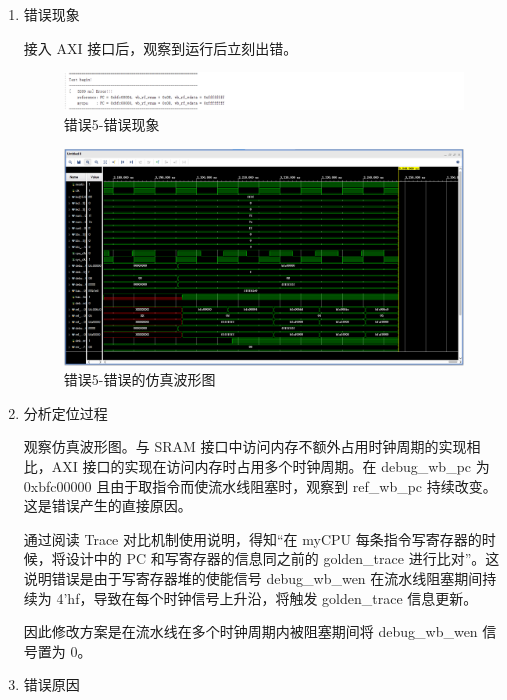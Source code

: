 \begin{enumerate}[(1)]
    \item 错误现象

接入 AXI 接口后，观察到运行后立刻出错。

\begin{figure}[H]
    \centering
    \includegraphics[width=\textwidth]{image/错误5-错误现象1.png}
    \caption{错误5-错误现象}
    \label{fig:错误5-错误现象1}
\end{figure}

\begin{figure}[H]
    \centering
    \includegraphics[width=\textwidth]{image/错误5-错误现象2.png}
    \caption{错误5-错误的仿真波形图}
    \label{fig:错误5-错误现象2}
\end{figure}

    \item 分析定位过程

观察仿真波形图。与 SRAM 接口中访问内存不额外占用时钟周期的实现相比，AXI 接口的实现在访问内存时占用多个时钟周期。在 debug\_wb\_pc 为 0xbfc00000 且由于取指令而使流水线阻塞时，观察到 ref\_wb\_pc 持续改变。这是错误产生的直接原因。

通过阅读 Trace 对比机制使用说明，得知“在 myCPU 每条指令写寄存器的时候，将设计中的 PC 和写寄存器的信息同之前的 golden\_trace 进行比对”。这说明错误是由于写寄存器堆的使能信号 debug\_wb\_wen 在流水线阻塞期间持续为 4’hf，导致在每个时钟信号上升沿，将触发 golden\_trace 信息更新。

因此修改方案是在流水线在多个时钟周期内被阻塞期间将 debug\_wb\_wen 信号置为 0。

    \item 错误原因


\end{enumerate}
